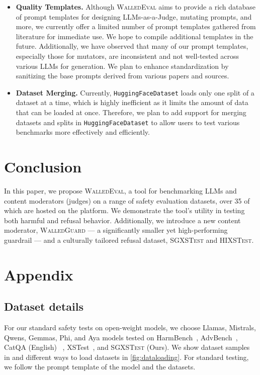 \documentclass[11pt]{article}
\newcommand{\tool}{\textsc{WalledEval}}
\newcommand{\guard}{\textsc{WalledGuard}}
\newcommand{\dataset}{\textsc{SGXSTest}}
\newcommand{\datacls}{{\color{purple} \texttt{HuggingFaceDataset}}}
\begin{document}
\begin{itemize}[left=1pt, labelsep=-1pt, label={\textbullet\hspace{0.1cm}}]
    \item \textbf{Quality Templates.} Although \tool{} aims to provide a rich database of prompt templates for designing LLMs-as-a-Judge, mutating prompts, and more, we currently offer a limited number of prompt templates gathered from literature for immediate use. We hope to compile additional templates in the future. Additionally, we have observed that many of our prompt templates, especially those for mutators, are inconsistent and not well-tested across various LLMs for generation. We plan to enhance standardization by sanitizing the base prompts derived from various papers and sources.

    \item \textbf{Dataset Merging.} Currently, \datacls{} loads only one split of a dataset at a time, which is highly inefficient as it limits the amount of data that can be loaded at once. Therefore, we plan to add support for merging datasets and splits in \datacls{} to allow users to test various benchmarks more effectively and efficiently.
\end{itemize}

\section{Conclusion}
In this paper, we propose \tool{}, a tool for benchmarking LLMs and content moderators (judges) on a range of safety evaluation datasets, over 35 of which are hosted on the platform. We demonstrate the tool's utility in testing both harmful and refusal behavior. Additionally, we introduce a new content moderator, \guard{} — a significantly smaller yet high-performing guardrail — and a culturally tailored refusal dataset, \dataset{} and \textsc{HIXSTest}.



\clearpage
\appendix

\section{Appendix}
\label{sec:appendix}
\subsection{Dataset details}
\label{sec:dataset}
For our standard safety tests on open-weight models, we choose Llamas, Mistrals, Qwens, Gemmas, Phi, and Aya models tested on HarmBench~\cite{mazeika2024harmbench}, AdvBench~\cite{zou2023universal}, CatQA (English) ~\cite{bhardwaj2024language}, XSTest~\cite{rottger2023xstest}, and \dataset{} (Ours). We show dataset samples in  and different ways to load datasets in \cref{fig:dataloading}. For standard testing, we follow the prompt template of the model and the datasets.
\end{document}

